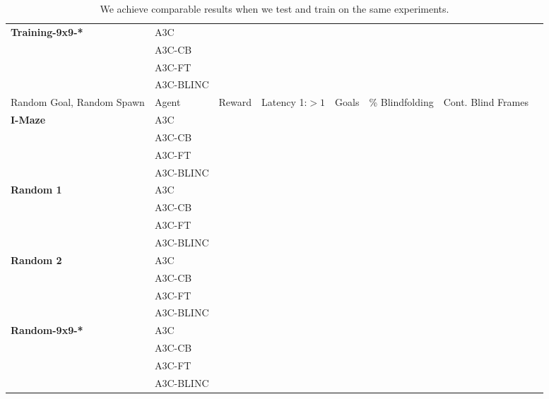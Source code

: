 \begin{table}[h]
\begin{center}
{\begin{tabular}{llllllll}
            \midrule
            \textbf{Training-9x9-*} &A3C &  &  &  \\
                              &A3C-CB &  &  &  \\
                              &A3C-FT &  &  &  \\
                              &A3C-BLINC &  &  &  \\
          \toprule
            Random Goal, Random Spawn & Agent & Reward & Latency 1:$>1$ & Goals & \% Blindfolding & Cont. Blind Frames \\
          \midrule
            \textbf{I-Maze} &A3C &  &  &  \\
                              &A3C-CB &  &  &  \\
                              &A3C-FT &  &  &  \\
                              &A3C-BLINC &  &  &  \\
          \midrule
            \textbf{Random 1} &A3C &  &  &  \\
                              &A3C-CB &  &  &  \\
                              &A3C-FT &  &  &  \\
                              &A3C-BLINC &  &  &  \\
          \midrule
            \textbf{Random 2} &A3C &  &  &  \\
                              &A3C-CB &  &  &  \\
                              &A3C-FT &  &  &  \\
                              &A3C-BLINC &  &  &  \\
          
            \midrule
            \textbf{Random-9x9-*} &A3C &  &  &  \\
                              &A3C-CB &  &  &  \\
                              &A3C-FT &  &  &  \\
                              &A3C-BLINC &  &  &  \\
          \bottomrule
        \end{tabular}}
    \end{center}
    \caption{We achieve comparable results when we test and train on the same experiments.}
\end{table}
\newpage
\newpage

